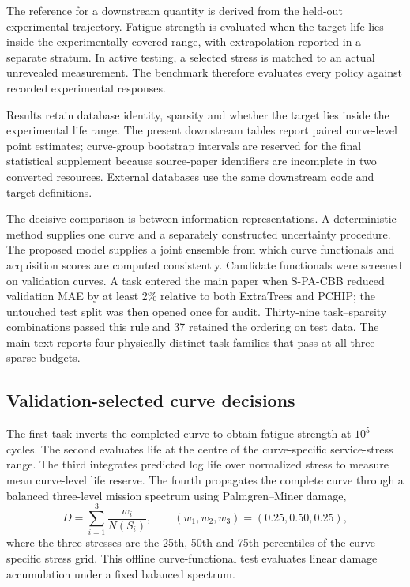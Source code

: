 \documentclass[a4paper,fleqn]{cas-dc}
\newcommand{\method}{S-PA-CBB}
\begin{document}
The reference for a downstream quantity is derived from the held-out experimental trajectory. Fatigue strength is evaluated when the target life lies inside the experimentally covered range, with extrapolation reported in a separate stratum. In active testing, a selected stress is matched to an actual unrevealed measurement. The benchmark therefore evaluates every policy against recorded experimental responses.

Results retain database identity, sparsity and whether the target lies inside the experimental life range. The present downstream tables report paired curve-level point estimates; curve-group bootstrap intervals are reserved for the final statistical supplement because source-paper identifiers are incomplete in two converted resources. External databases use the same downstream code and target definitions.

The decisive comparison is between information representations. A deterministic method supplies one curve and a separately constructed uncertainty procedure. The proposed model supplies a joint ensemble from which curve functionals and acquisition scores are computed consistently. Candidate functionals were screened on validation curves. A task entered the main paper when \method{} reduced validation MAE by at least 2\% relative to both ExtraTrees and PCHIP; the untouched test split was then opened once for audit. Thirty-nine task--sparsity combinations passed this rule and 37 retained the ordering on test data. The main text reports four physically distinct task families that pass at all three sparse budgets.

\subsection{Validation-selected curve decisions}

The first task inverts the completed curve to obtain fatigue strength at $10^5$ cycles. The second evaluates life at the centre of the curve-specific service-stress range. The third integrates predicted log life over normalized stress to measure mean curve-level life reserve. The fourth propagates the complete curve through a balanced three-level mission spectrum using Palmgren--Miner damage,
\begin{equation}
 D=\sum_{i=1}^{3}\frac{w_i}{N(S_i)},\qquad
 (w_1,w_2,w_3)=(0.25,0.50,0.25),
 \label{eq:miner}
\end{equation}
where the three stresses are the 25th, 50th and 75th percentiles of the curve-specific stress grid. This offline curve-functional test evaluates linear damage accumulation under a fixed balanced spectrum.
\end{document}
